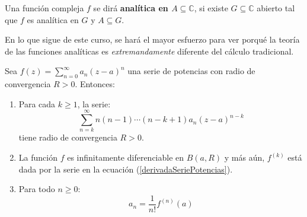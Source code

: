\documentclass[12pt]{report}
\newcounter{it}
\theoremstyle{largebreak}
\newcommand{\tbf}[1]{\textbf{#1}}
\begin{document}
    \begin{mydef}
        Una función compleja $f$ se dirá \tbf{analítica en $A\subseteq\mathbb{C}$}, si existe $G\subseteq\mathbb{C}$ abierto tal que $f$ es analítica en $G$ y $A\subseteq G$.
    \end{mydef}

    En lo que sigue de este curso, se hará el mayor esfuerzo para ver porqué la teoría de las funciones analíticas es \textit{extremandamente} diferente del cálculo tradicional.

    \begin{propo}
        Sea $f(z)=\sum_{ n=0}^\infty a_n(z-a)^n$ una serie de potencias con radio de convergencia $R>0$. Entonces:
        \begin{enumerate}[label = \textit{(\arabic*)}]
            \item Para cada $k\geq 1$, la serie:
            \begin{equation}
                \label{derivadaSeriePotencias}
                \sum_{n=k}^\infty n(n-1)\cdots(n-k+1)a_n(z-a)^{ n-k}
            \end{equation}
            tiene radio de convergencia $R>0$.
            \item La función $f$ es infinitamente diferenciable en $B(a,R)$ y más aún, $f^{(k)}$ está dada por la serie en la ecuación (\ref{derivadaSeriePotencias}).
            \item Para todo $n\geq0$:
            \begin{equation*}
                a_n=\frac{1}{n!}f^{(n)}(a)
            \end{equation*}
        \end{enumerate}
    \end{propo}
\end{document}
